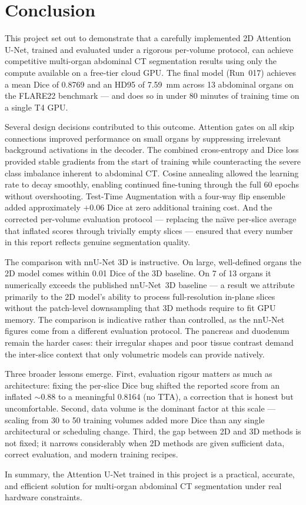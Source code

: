 \chapter{Conclusion}
\label{chap:conc}

This project set out to demonstrate that a carefully implemented 2D Attention U-Net, trained
and evaluated under a rigorous per-volume protocol, can achieve competitive multi-organ
abdominal CT segmentation results using only the compute available on a free-tier cloud GPU.
The final model (Run~017) achieves a mean Dice of 0.8769 and an HD95 of 7.59~mm across 13
abdominal organs on the FLARE22 benchmark --- and does so in under 80 minutes of training
time on a single T4 GPU.

Several design decisions contributed to this outcome. Attention gates on all skip connections
improved performance on small organs by suppressing irrelevant background activations in the
decoder. The combined cross-entropy and Dice loss provided stable gradients from the start of
training while counteracting the severe class imbalance inherent to abdominal CT. Cosine
annealing allowed the learning rate to decay smoothly, enabling continued fine-tuning through
the full 60 epochs without overshooting. Test-Time Augmentation with a four-way flip ensemble
added approximately $+$0.06 Dice at zero additional training cost. And the corrected per-volume
evaluation protocol --- replacing the na\"\i{}ve per-slice average that inflated scores through
trivially empty slices --- ensured that every number in this report reflects genuine
segmentation quality.

The comparison with nnU-Net 3D is instructive. On large, well-defined organs the 2D model
comes within 0.01 Dice of the 3D baseline. On 7 of 13 organs it numerically exceeds the published nnU-Net~3D baseline --- a result we
attribute primarily to the 2D model's ability to process full-resolution in-plane slices
without the patch-level downsampling that 3D methods require to fit GPU memory. The
comparison is indicative rather than controlled, as the nnU-Net figures come from a different
evaluation protocol. The pancreas and duodenum remain the
harder cases: their irregular shapes and poor tissue contrast demand the inter-slice context
that only volumetric models can provide natively.

Three broader lessons emerge. First, evaluation rigour matters as much as architecture: fixing
the per-slice Dice bug shifted the reported score from an inflated $\sim$0.88 to a meaningful
0.8164 (no TTA), a correction that is honest but uncomfortable. Second, data volume is the
dominant factor at this scale --- scaling from 30 to 50 training volumes added more Dice than
any single architectural or scheduling change. Third, the gap between 2D and 3D methods is not
fixed; it narrows considerably when 2D methods are given sufficient data, correct evaluation,
and modern training recipes.

In summary, the Attention U-Net trained in this project is a practical, accurate, and efficient
solution for multi-organ abdominal CT segmentation under real hardware constraints.
